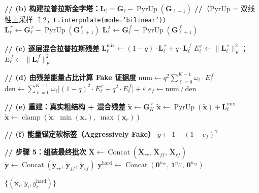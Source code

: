\documentclass[12pt]{article}
\begin{document}
\begin{algorithm}[p]
\begin{algorithmic}[1]
    \State \textbf{// (b) 构建拉普拉斯金字塔：}$\mathbf{L}_\ell = \mathbf{G}_\ell - \operatorname{PyrUp}(\mathbf{G}_{\ell+1})$
    \State \textbf{//}（PyrUp = 双线性上采样 $\uparrow\!2$，\texttt{F.interpolate(mode='bilinear')}）
      \State $\mathbf{L}_\ell^{\,r} \gets \mathbf{G}_\ell^{\,r} - \operatorname{PyrUp}(\mathbf{G}_{\ell+1}^{\,r})$
      \State $\mathbf{L}_\ell^{\,f} \gets \mathbf{G}_\ell^{\,f} - \operatorname{PyrUp}(\mathbf{G}_{\ell+1}^{\,f})$
    \EndFor

    \State \textbf{// (c) 逐层混合拉普拉斯残差}
      \State $\mathbf{L}_\ell^{\text{mix}} \gets (1 - q) \cdot \mathbf{L}_\ell^{\,r} + q \cdot \mathbf{L}_\ell^{\,f}$
      \State $E_\ell^{\,r} \gets \|\mathbf{L}_\ell^{\,r}\|_F^2$；\quad $E_\ell^{\,f} \gets \|\mathbf{L}_\ell^{\,f}\|_F^2$
    \EndFor

    \State \textbf{// (d) 由残差能量占比计算 Fake 证据度}
    \State $\text{num} \gets q^2 \sum_{\ell=0}^{K-1} \omega_\ell \cdot E_\ell^{\,f}$
    \State $\text{den} \gets \sum_{\ell=0}^{K-1} \omega_\ell\big[(1-q)^2 \cdot E_\ell^{\,r} + q^2 \cdot E_\ell^{\,f}\big] + \varepsilon$
    \State $e_f \gets \text{num} \,/\, \text{den}$

    \State \textbf{// (e) 重建：真实粗结构 + 混合残差}
    \State $\tilde{\mathbf{x}} \gets \mathbf{G}_K^{\,r}$ 
      \State $\tilde{\mathbf{x}} \gets \operatorname{PyrUp}(\tilde{\mathbf{x}}) + \mathbf{L}_\ell^{\text{mix}}$
    \EndFor
    \State $\tilde{\mathbf{x}} \gets \operatorname{clamp}(\tilde{\mathbf{x}},\; \min(\mathbf{x}_r),\; \max(\mathbf{x}_r))$

    \State \textbf{// (f) 能量锚定软标签（Aggressively Fake）}
    \State $\tilde{y} \gets 1 - (1 - e_f)^{\gamma}$
  \EndFor
\EndIf

\State \textbf{// 步骤 5：组装最终批次}
\State $\tilde{\mathbf{X}} \gets \operatorname{Concat}(\tilde{\mathbf{X}}_{rr},\, \tilde{\mathbf{X}}_{ff},\, \tilde{\mathbf{X}}_{rf})$
\State $\tilde{\mathbf{y}} \gets \operatorname{Concat}(\tilde{\mathbf{y}}_{rr},\, \tilde{\mathbf{y}}_{ff},\, \tilde{\mathbf{y}}_{rf})$
\State $\mathbf{y}^{\text{hard}} \gets \operatorname{Concat}(\mathbf{0}^{n_{rr}},\, \mathbf{1}^{n_{ff}},\, \mathbf{0}^{n_{rf}})$

\State \Return $\{(\tilde{\mathbf{x}}_i, \tilde{y}_i, y^{\text{hard}}_i)\}$

\end{algorithmic}
\end{algorithm}
\end{document}
